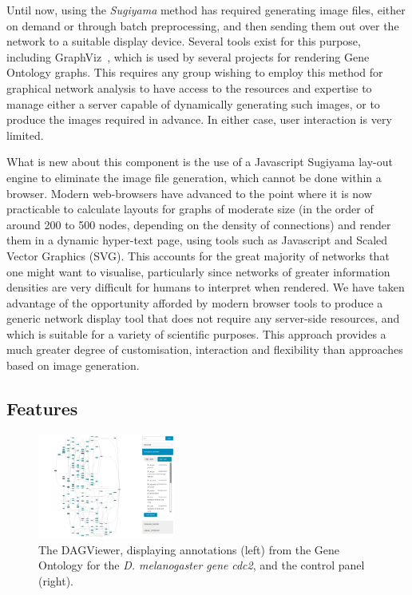 \documentclass[10pt,a4paper,twocolumn]{article}
\begin{document}
Until now, using the \emph{Sugiyama} method has required generating image files,
either on demand or through batch preprocessing, and then sending them out over
the network to a suitable display device. Several tools exist for this purpose,
including GraphViz~\cite{graphviz}, which is used by several projects for
rendering Gene Ontology graphs. This requires any group wishing to employ
this method for graphical network analysis to have access to the resources and
expertise to manage either a server capable of dynamically generating such
images, or to produce the images required in advance. In either case, user
interaction is very limited.

What is new about this component is the use of a Javascript Sugiyama lay-out
engine to eliminate the image file generation, which cannot be done within a
browser. Modern web-browsers have advanced to the point where it is now
practicable to calculate layouts for graphs of moderate size (in the order of
around 200 to 500 nodes, depending on the density of connections) and render
them in a dynamic hyper-text page, using tools such as Javascript and Scaled
Vector Graphics (SVG). This accounts for the great majority of networks that one
might want to visualise, particularly since networks of greater information
densities are very difficult for humans to interpret when rendered. We have
taken advantage of the opportunity afforded by modern browser tools to produce a
generic network display tool that does not require any server-side resources,
and which is suitable for a variety of scientific purposes. This approach
provides a much greater degree of customisation, interaction and flexibility
than approaches based on image generation.

\subsection*{Features}

\begin{figure}[htb]
\centering
\includegraphics[width=0.4\textwidth]{dagify.png}
\caption{
    \label{fig:1}
    The DAGViewer, displaying annotations (left) from the Gene Ontology for
    the \textit{D. melanogaster gene} \emph{cdc2}, and the control panel (right).
}
\end{figure}
\end{document}
